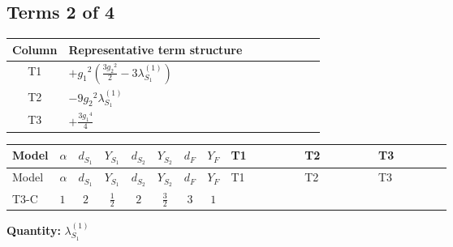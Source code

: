 \documentclass[8pt]{article}
\begin{document}
\begin{landscape}
\subsection*{Terms 2 of 4}
\begin{center}
\begin{tabular}{@{}c >{\raggedright\arraybackslash}p{0.82\linewidth}@{}}
\toprule
Column & Representative term structure \\
\midrule
T1 & \(\displaystyle +{g_1}^2 \left(\frac{3 {g_2}^2}{2}-3 {\lambda_{S_1}^{(1)}}\right)\) \\
\midrule
T2 & \(\displaystyle -9 {g_2}^2 {\lambda_{S_1}^{(1)}}\) \\
\midrule
T3 & \(\displaystyle +\frac{3 {g_1}^4}{4}\) \\
\midrule
\bottomrule
\end{tabular}
\end{center}
\smallskip
\tiny
\begin{longtable}{@{}llcccccc >{\raggedright\arraybackslash}p{0.21\linewidth} >{\raggedright\arraybackslash}p{0.21\linewidth} >{\raggedright\arraybackslash}p{0.21\linewidth}@{}}
\toprule
Model & $\alpha$ & $d_{S_1}$ & $Y_{S_1}$ & $d_{S_2}$ & $Y_{S_2}$ & $d_F$ & $Y_F$ & T1 & T2 & T3 \\
\midrule
\endfirsthead
\toprule
Model & $\alpha$ & $d_{S_1}$ & $Y_{S_1}$ & $d_{S_2}$ & $Y_{S_2}$ & $d_F$ & $Y_F$ & T1 & T2 & T3 \\
\midrule
\endhead
T3-C & $1$ & $2$ & $\frac{1}{2}$ & $2$ & $\frac{3}{2}$ & $3$ & $1$ & \scriptsize\adjustbox{max width=\linewidth}{$\begin{gathered} +{g_1}^2 \left(\frac{3 {g_2}^2}{2}-3 {\lambda_{S_1}^{(1)}}\right)\end{gathered}$} & \scriptsize\adjustbox{max width=\linewidth}{$\begin{gathered} -9 {g_2}^2 {\lambda_{S_1}^{(1)}}\end{gathered}$} & \scriptsize\adjustbox{max width=\linewidth}{$\begin{gathered} +\frac{3 {g_1}^4}{4}\end{gathered}$} \\
\midrule
\bottomrule
\end{longtable}
\clearpage
\noindent\textbf{Quantity: }$\lambda_{S_1}^{(1)}$\par\smallskip

\end{landscape}
\end{document}
